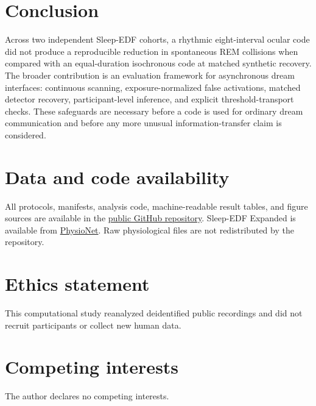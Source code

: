 \documentclass[10pt,twocolumn]{article}
\begin{document}
\section{Conclusion}

Across two independent Sleep-EDF cohorts, a rhythmic eight-interval ocular code did not produce a reproducible reduction in spontaneous REM collisions when compared with an equal-duration isochronous code at matched synthetic recovery. The broader contribution is an evaluation framework for asynchronous dream interfaces: continuous scanning, exposure-normalized false activations, matched detector recovery, participant-level inference, and explicit threshold-transport checks. These safeguards are necessary before a code is used for ordinary dream communication and before any more unusual information-transfer claim is considered.

\clearpage
\section*{Data and code availability}

All protocols, manifests, analysis code, machine-readable result tables, and figure sources are available in the \href{https://github.com/asim-v/rem-ocular-code-collision-benchmark}{public GitHub repository}. Sleep-EDF Expanded is available from \href{https://physionet.org/content/sleep-edfx/1.0.0/}{PhysioNet}. Raw physiological files are not redistributed by the repository.

\section*{Ethics statement}

This computational study reanalyzed deidentified public recordings and did not recruit participants or collect new human data.

\section*{Competing interests}

The author declares no competing interests.

\footnotesize
\setlength{\bibsep}{1pt}


\end{document}
